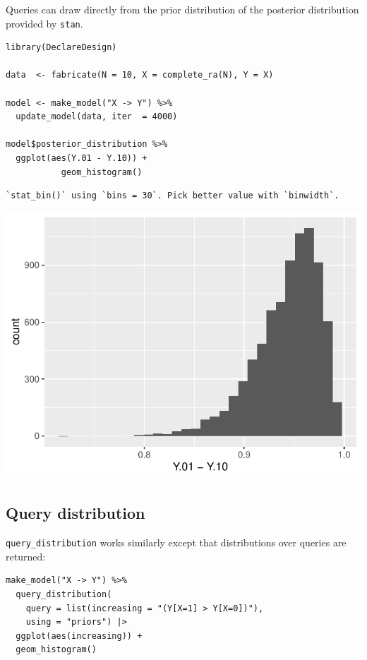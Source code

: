 \documentclass[
  article]{jss}
\begin{document}
Queries can draw directly from the prior distribution of the posterior
distribution provided by \texttt{stan}.

\begin{verbatim}
library(DeclareDesign)

data  <- fabricate(N = 10, X = complete_ra(N), Y = X)

model <- make_model("X -> Y") %>%
  update_model(data, iter  = 4000)

model$posterior_distribution %>% 
  ggplot(aes(Y.01 - Y.10)) + 
           geom_histogram()
\end{verbatim}

\begin{verbatim}
`stat_bin()` using `bins = 30`. Pick better value with `binwidth`.
\end{verbatim}

\includegraphics{paper_files/figure-pdf/unnamed-chunk-33-1.pdf}

\hypertarget{query-distribution}{%
\subsection{Query distribution}\label{query-distribution}}

\texttt{query\_distribution} works similarly except that distributions
over queries are returned:

\begin{verbatim}
make_model("X -> Y") %>% 
  query_distribution(
    query = list(increasing = "(Y[X=1] > Y[X=0])"), 
    using = "priors") |>
  ggplot(aes(increasing)) +
  geom_histogram()
\end{verbatim}
\end{document}
